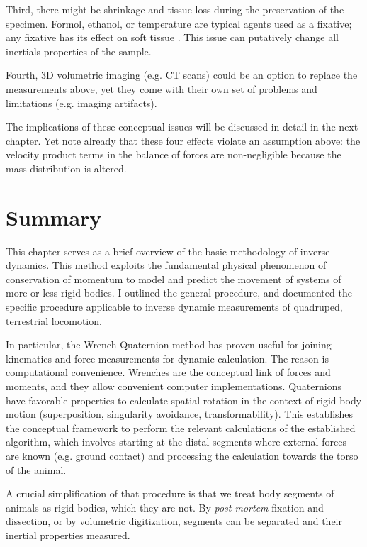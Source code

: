 \documentclass[10pt,a4paper]{article}
\begin{document}
Third, there might be shrinkage and tissue loss during the preservation of the specimen.
Formol, ethanol, or temperature are typical agents used as a fixative; any fixative has its effect on soft tissue \citep{Buytaert2014,Pech1987}.
This issue can putatively change all inertials properties of the sample.

Fourth, 3D volumetric imaging (e.g. CT scans) could be an option to replace the measurements above, yet they come with their own set of problems and limitations (e.g. imaging artifacts).


The implications of these conceptual issues will be discussed in detail in the next chapter.
Yet note already that these four effects violate an assumption above: the velocity product terms in the balance of forces are non-negligible because the mass distribution is altered.


\clearpage
\section{Summary}
\label{sec:orgcdbfe9d}
This chapter serves as a brief overview of the basic methodology of inverse dynamics.
This method exploits the fundamental physical phenomenon of conservation of momentum to model and predict the movement of systems of more or less rigid bodies.
I outlined the general procedure, and documented the specific procedure applicable to inverse dynamic measurements of quadruped, terrestrial locomotion.


In particular, the Wrench-Quaternion method \citep{Dumas2004} has proven useful for joining kinematics and force measurements for dynamic calculation.
The reason is computational convenience.
Wrenches are the conceptual link of forces and moments, and they allow convenient computer implementations.
Quaternions have favorable properties to calculate spatial rotation in the context of rigid body motion (superposition, singularity avoidance, transformability).
This establishes the conceptual framework to perform the relevant calculations of the established algorithm, which involves starting at the distal segments where external forces are known (e.g. ground contact) and processing the calculation towards the torso of the animal.


A crucial simplification of that procedure is that we treat body segments of animals as rigid bodies, which they are not.
By \emph{post mortem} fixation and dissection, or by volumetric digitization, segments can be separated and their inertial properties measured.



\clearpage



\end{document}
